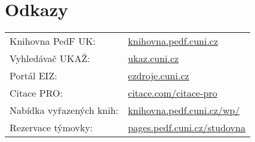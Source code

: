 \section{Odkazy}

\footnotesize
\begin{tabular}{@{}ll@{}}
  Knihovna PedF UK:& \url{knihovna.pedf.cuni.cz} \\

  Vyhledávač UKAŽ:& \url{ukaz.cuni.cz} \\
  Portál EIZ:& \url{ezdroje.cuni.cz}\\
  Citace PRO: & \url{citace.com/citace-pro} \\
  Nabídka vyřazených knih: &\url{knihovna.pedf.cuni.cz/wp/} \\
  Rezervace týmovky: & \url{pages.pedf.cuni.cz/studovna}\\


\end{tabular}
